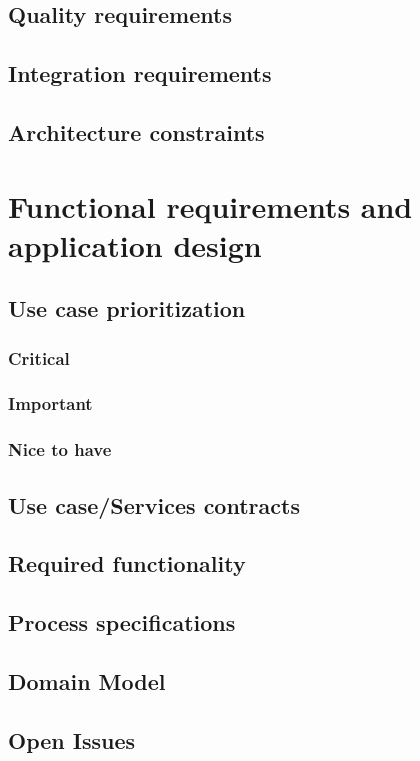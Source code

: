 \documentclass[a4paper, 10pt, oneside]{article}
\begin{document}
	\subsection{Quality requirements}
	\subsection{Integration requirements}
	\subsection{Architecture constraints}

\section{ Functional requirements and application design}
	\subsection{Use case prioritization}
		\subsubsection{Critical}
		\subsubsection{Important}
		\subsubsection{Nice to have}
	\subsection{Use case/Services contracts}

\newpage



\newpage
\subsection{Required functionality}
\subsection{Process specifications}
\subsection{Domain Model}
\subsection{Open Issues}
\end{document}
